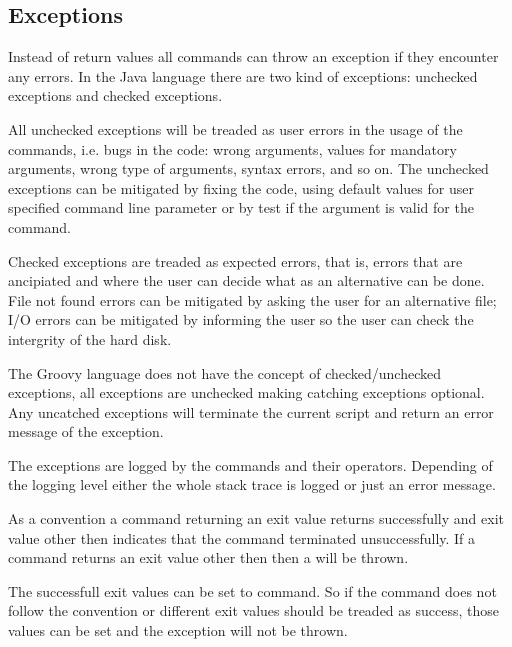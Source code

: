 \subsection{Exceptions}

Instead of return values all commands can throw an exception if they encounter
any errors. In the Java language there are two kind of exceptions:
unchecked exceptions and checked exceptions.

All unchecked exceptions will be treaded as user errors in the usage of the
commands, i.e. bugs in the code: wrong arguments,  values for mandatory arguments,
wrong type of arguments, syntax errors, and so on. The unchecked exceptions
can be mitigated by fixing the code, using default values for user specified 
command line parameter or by test if the argument is valid for the command.

Checked exceptions are treaded as expected errors, that is, errors that are ancipiated
and where the user can decide what as an alternative can be done. File not found
errors can be mitigated by asking the user for an alternative file; I/O errors
can be mitigated by informing the user so the user can check the intergrity
of the hard disk.

The Groovy language does not have the concept of checked/unchecked exceptions,
all exceptions are unchecked making catching exceptions optional. Any uncatched
exceptions will terminate the current script and return an error message of
the exception.

The exceptions are logged by the commands and their operators. Depending of the
logging level either the whole stack trace is logged or just an error message.

%

As a convention a command returning an exit value  returns 
successfully and exit value other then  indicates that the command
terminated unsuccessfully. If a command returns an exit value other then 
then a  will be thrown.

The successfull exit values can be set to command. So if the command does not
follow the convention or different exit values should be treaded as success,
those values can be set and the exception will not be thrown.

